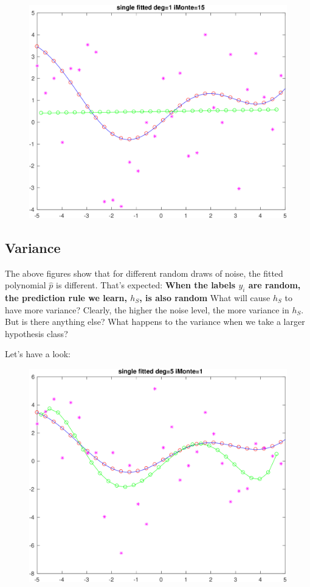 \documentclass[11pt]{article}
\begin{document}
\begin{figure}[h!]
\centering\includegraphics[scale=0.1]{single_poly_d_1_iMonte_15.png}
\end{figure}



\newpage
\subsection{Variance}
The above figures show that for different random draws of noise, the fitted polynomial $\hat{p}$ is different.  That's expected: {\bf When the labels $y_i$ are random, the prediction rule we learn, $h_S$, is also random}
What will cause $h_S$ to have more variance?  Clearly, the higher the noise level, the more variance in $h_S$. But is there anything else? What happens to the variance when we take a larger hypothesis class?

Let's have a look:




\begin{figure}[h!]
\centering\includegraphics[scale=0.1]{single_poly_d_5_iMonte_1.png}
\end{figure}
\end{document}
